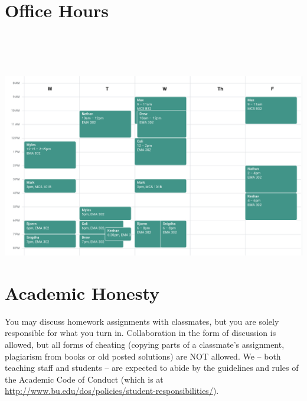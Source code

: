 \documentclass[11pt]{article}
\begin{document}
\newpage

\section*{Office Hours}

~\\~\\~\\

\centerline{\includegraphics[width=\textwidth]{office-hours-schedule.png}}

\newpage

\section*{Academic Honesty}

You may discuss homework assignments with classmates, but you are 
solely responsible for what you turn in. Collaboration in the form of
discussion is allowed, but all forms of cheating (copying parts of a
classmate's assignment, plagiarism from books or old posted solutions)
are NOT allowed. We -- both teaching staff and students -- are expected
to abide by the guidelines and rules of the Academic Code of Conduct
(which is at
\url{http://www.bu.edu/dos/policies/student-responsibilities/}).
\end{document}
